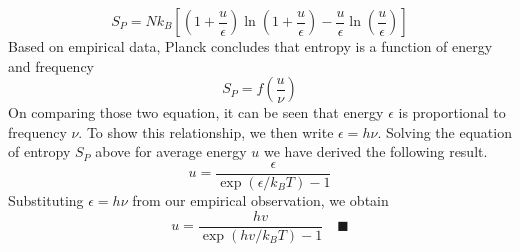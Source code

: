 \documentclass[../../../Main.tex]{subfiles}
\begin{document}
\begin{equation*}
    S_P=Nk_B\left[\left(1+\frac{u}{\epsilon} \right) \ln \left(1+\frac{u}{\epsilon}\right)-\frac{u}{\epsilon}\ln\left(\frac{u}{\epsilon}\right)\right]
\end{equation*}
Based on empirical data, Planck concludes that entropy is a function of energy and frequency
\begin{equation*}
    S_P=f\left(\frac{u}{\nu}\right)
\end{equation*}
On comparing those two equation, it can be seen that energy $\epsilon$ is proportional to frequency $\nu$. To show this relationship, we then write $\epsilon=h\nu$. Solving the equation of entropy $S_P$ above for average energy $u$ we have derived the following result.
\begin{equation*}
    u=\frac{\epsilon}{\exp(\epsilon/k_BT)-1}
\end{equation*}
Substituting $\epsilon=h\nu$ from our empirical observation, we obtain
\begin{equation*}
    u=\frac{hv}{\exp(hv/k_BT)-1}\quad\blacksquare
\end{equation*}
\end{document}
